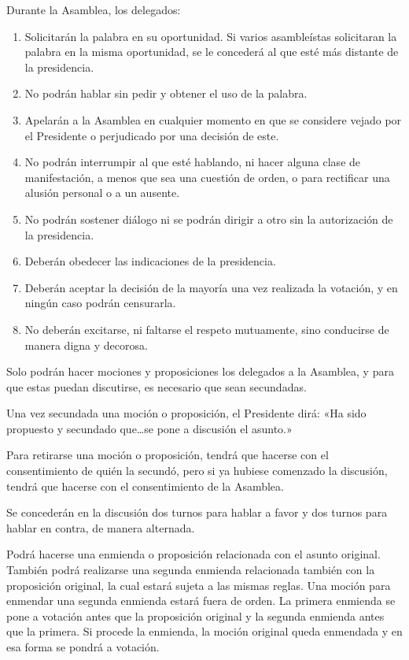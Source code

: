 \article
Durante la Asamblea, los delegados:
\begin{enumerate}
    \item Solicitarán la palabra en su oportunidad. Si varios asambleístas solicitaran la palabra en la misma oportunidad, se le concederá al que esté más distante de la presidencia.
    \item No podrán hablar sin pedir y obtener el uso de la palabra.
    \item Apelarán a la Asamblea en cualquier momento en que se considere vejado por el Presidente o perjudicado por una decisión de este.
    \item No podrán interrumpir al que esté hablando, ni hacer alguna clase de manifestación, a menos que sea una cuestión de orden, o para rectificar una alusión personal o a un ausente.
    \item No podrán sostener diálogo ni se podrán dirigir a otro sin la autorización de la presidencia.
    \item Deberán obedecer las indicaciones de la presidencia.
    \item Deberán aceptar la decisión de la mayoría una vez realizada la votación, y en ningún caso podrán censurarla.
    \item No deberán excitarse, ni faltarse el respeto mutuamente, sino conducirse de manera digna y decorosa.
\end{enumerate}


\article
Solo podrán hacer mociones y proposiciones los delegados a la Asamblea, y para que estas puedan discutirse, es necesario que sean secundadas.

\article
Una vez secundada una moción o proposición, el Presidente dirá: «Ha sido propuesto y secundado que\ldots se pone a discusión el asunto.»

\article
Para retirarse una moción o proposición, tendrá que hacerse con el consentimiento de quién la secundó, pero si ya hubiese comenzado la discusión, tendrá que hacerse con el consentimiento de la Asamblea.

\article
Se concederán en la discusión dos turnos para hablar a favor y dos turnos para hablar en contra, de manera alternada.

\article
Podrá hacerse una enmienda o proposición relacionada con el asunto original. También podrá realizarse una segunda enmienda relacionada también con la proposición original, la cual estará sujeta a las mismas reglas. Una moción para enmendar una segunda enmienda estará fuera de orden. La primera enmienda se pone a votación antes que la proposición original y la segunda enmienda antes que la primera. Si procede la enmienda, la moción original queda enmendada y en esa forma se pondrá a votación.

